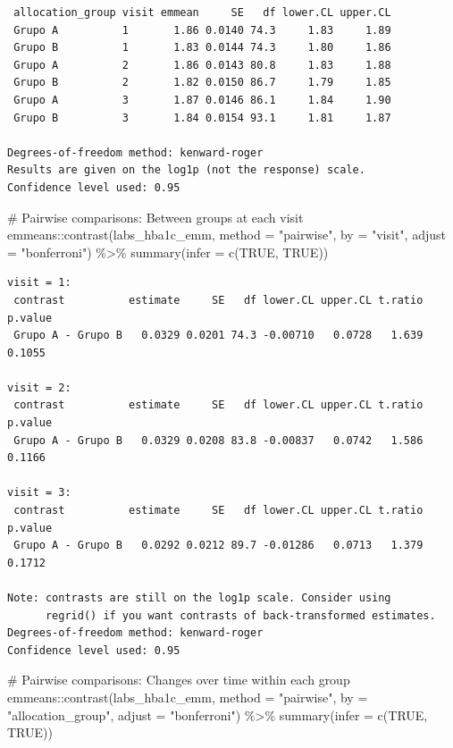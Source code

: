 \documentclass[
  letterpaper,
  DIV=11,
  numbers=noendperiod]{scrartcl}
\newenvironment{Shaded}{\begin{snugshade}}{\end{snugshade}}
\newcommand{\AttributeTok}[1]{\textcolor[rgb]{0.40,0.45,0.13}{#1}}
\newcommand{\CommentTok}[1]{\textcolor[rgb]{0.37,0.37,0.37}{#1}}
\newcommand{\ConstantTok}[1]{\textcolor[rgb]{0.56,0.35,0.01}{#1}}
\newcommand{\FunctionTok}[1]{\textcolor[rgb]{0.28,0.35,0.67}{#1}}
\newcommand{\NormalTok}[1]{\textcolor[rgb]{0.00,0.23,0.31}{#1}}
\newcommand{\SpecialCharTok}[1]{\textcolor[rgb]{0.37,0.37,0.37}{#1}}
\newcommand{\StringTok}[1]{\textcolor[rgb]{0.13,0.47,0.30}{#1}}
\begin{document}
\begin{verbatim}
 allocation_group visit emmean     SE   df lower.CL upper.CL
 Grupo A          1       1.86 0.0140 74.3     1.83     1.89
 Grupo B          1       1.83 0.0144 74.3     1.80     1.86
 Grupo A          2       1.86 0.0143 80.8     1.83     1.88
 Grupo B          2       1.82 0.0150 86.7     1.79     1.85
 Grupo A          3       1.87 0.0146 86.1     1.84     1.90
 Grupo B          3       1.84 0.0154 93.1     1.81     1.87

Degrees-of-freedom method: kenward-roger 
Results are given on the log1p (not the response) scale. 
Confidence level used: 0.95 
\end{verbatim}

\begin{Shaded}
\begin{Highlighting}[]
\CommentTok{\# Pairwise comparisons: Between groups at each visit}
\NormalTok{emmeans}\SpecialCharTok{::}\FunctionTok{contrast}\NormalTok{(labs\_hba1c\_emm, }\AttributeTok{method =} \StringTok{"pairwise"}\NormalTok{, }\AttributeTok{by =} \StringTok{"visit"}\NormalTok{, }\AttributeTok{adjust =} \StringTok{"bonferroni"}\NormalTok{) }\SpecialCharTok{\%\textgreater{}\%} \FunctionTok{summary}\NormalTok{(}\AttributeTok{infer =} \FunctionTok{c}\NormalTok{(}\ConstantTok{TRUE}\NormalTok{, }\ConstantTok{TRUE}\NormalTok{))}
\end{Highlighting}
\end{Shaded}

\begin{verbatim}
visit = 1:
 contrast          estimate     SE   df lower.CL upper.CL t.ratio p.value
 Grupo A - Grupo B   0.0329 0.0201 74.3 -0.00710   0.0728   1.639  0.1055

visit = 2:
 contrast          estimate     SE   df lower.CL upper.CL t.ratio p.value
 Grupo A - Grupo B   0.0329 0.0208 83.8 -0.00837   0.0742   1.586  0.1166

visit = 3:
 contrast          estimate     SE   df lower.CL upper.CL t.ratio p.value
 Grupo A - Grupo B   0.0292 0.0212 89.7 -0.01286   0.0713   1.379  0.1712

Note: contrasts are still on the log1p scale. Consider using
      regrid() if you want contrasts of back-transformed estimates. 
Degrees-of-freedom method: kenward-roger 
Confidence level used: 0.95 
\end{verbatim}

\begin{Shaded}
\begin{Highlighting}[]
\CommentTok{\# Pairwise comparisons: Changes over time within each group}
\NormalTok{emmeans}\SpecialCharTok{::}\FunctionTok{contrast}\NormalTok{(labs\_hba1c\_emm, }\AttributeTok{method =} \StringTok{"pairwise"}\NormalTok{, }\AttributeTok{by =} \StringTok{"allocation\_group"}\NormalTok{, }\AttributeTok{adjust =} \StringTok{"bonferroni"}\NormalTok{) }\SpecialCharTok{\%\textgreater{}\%} \FunctionTok{summary}\NormalTok{(}\AttributeTok{infer =} \FunctionTok{c}\NormalTok{(}\ConstantTok{TRUE}\NormalTok{, }\ConstantTok{TRUE}\NormalTok{))}
\end{Highlighting}
\end{Shaded}
\end{document}
